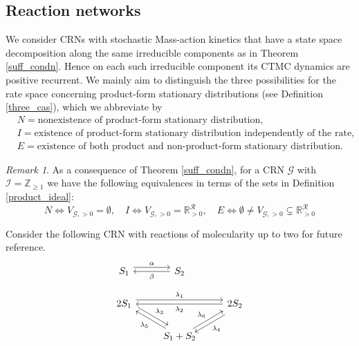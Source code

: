 \documentclass{amsart}
\theoremstyle{definition}
\theoremstyle{remark}
\newtheorem{remark}[theorem]{Remark}
\theoremstyle{Conjecture/open problem}
\theoremstyle{assumption}
\theoremstyle{conjecture}
\def\la{\lambda}
\def\I{\mathcal{I}}
\def\la{\lambda}
\def\cG{\mathcal{G}}
\def\cR{\mathcal{R}}
\def\R{\mathbb{R}}
\def\Z{\mathbb{Z}}
\numberwithin{equation}{section}
\begin{document}
\subsection{Reaction networks}\label{sect_ex}\hfill\break
We consider CRNs with stochastic Mass-action kinetics that have a state space decomposition along the same irreducible components as in Theorem \ref{suff_condn}. Hence on each such irreducible component its CTMC dynamics are positive recurrent.
We mainly aim to distinguish the three possibilities for the rate space concerning product-form stationary distributions (see Definition \ref{three_cas}), which we abbreviate by 
\begin{align*}
&N = \text{nonexistence of product-form stationary distribution},\\
 &I = \text{existence of product-form stationary distribution independently of the rate},\\
 &E = \text{existence of both product and non-product-form stationary distribution}.
 \end{align*}
 \begin{remark}
 As a consequence of Theorem \ref{suff_condn}, for a CRN $\cG$ with $\I=\Z_{\geq 1}$ we have the following equivalences in terms of the sets in Definition \ref{product_ideal}:
 $$N\iff V_{\cG,>0}=\emptyset,\quad I\iff V_{\cG,>0}=\R^\cR_{>0},\quad E\iff \emptyset\neq V_{\cG,>0}\subsetneq\R^\cR_{>0}$$
 \end{remark}
Consider the following CRN with reactions of molecularity up to two for future reference.
\begin{equation}\begin{tikzcd}\label{eq:big_RN}
S_1\arrow[r, shift left=1ex,"\alpha"]  &S_2 \arrow[l,"\beta"]\\ 
2S_1 \arrow[rr, shift left=1ex,"\la_1"] 
\arrow[dr,  shift left=1ex,"\la_3"] 
&& 2S_2 \arrow[dl, shift left=1ex,"\la_4"] \arrow[ll,"\la_2"]\\
& S_1+S_2\arrow[ul,"\la_5"]\arrow[ur,"\la_6"]
\end{tikzcd}
\end{equation}
\end{document}

